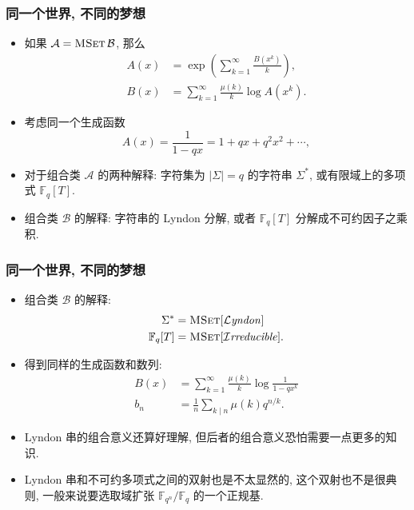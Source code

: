 \documentclass{ctexbeamer}
\newcommand{\bbF}{\mathbb F}
\DeclareMathOperator{\MSet}{\textsc{MSet}}
\begin{document}
\begin{frame}
  \frametitle{同一个世界, 不同的梦想}

  \begin{itemize}
    \item 如果 $\mathcal A = \MSet \mathcal B$, 那么
    \begin{align}
      A(x) &= \exp \left( \sum_{k=1}^\infty \frac{B(x^k)}{k} \right),\\
      B(x) &= \sum_{k=1}^\infty \frac{\mu(k)}{k} \log A(x^k).
    \end{align}
    \item 考虑同一个生成函数
    \begin{equation}
      A(x) = \frac 1{1 - qx} = 1 + qx + q^2 x^2 + \cdots,
    \end{equation}
    \item 对于组合类 $\mathcal A$ 的两种解释: 字符集为 $|\Sigma| = q$ 的字符串 $\Sigma^*$,
    或有限域上的多项式 $\bbF_q[T]$.
    \item 组合类 $\mathcal B$ 的解释: 字符串的 Lyndon 分解, 或者 $\bbF_q[T]$ 分解成不可约因子之乘积.
  \end{itemize}

\end{frame}

\begin{frame}
  \frametitle{同一个世界, 不同的梦想}

  \begin{itemize}
    \item 组合类 $\mathcal B$ 的解释:
    \begin{align}
      \Sigma^* &= \MSet [\mathcal{L}\mathit{yndon}]\\
      \bbF_q[T] &= \MSet [\mathcal{I}\mathit{rreducible}].
    \end{align}
    \item 得到同样的生成函数和数列:
    \begin{align}
      B(x) &= \sum_{k=1}^\infty \frac{\mu(k)}{k}\log \frac 1{1-qx^k}\\
      b_n &= \frac 1 n \sum_{k \mid n} \mu(k) q^{n/k}.
    \end{align}
    \item Lyndon 串的组合意义还算好理解, 但后者的组合意义恐怕需要一点更多的知识.
    \item Lyndon 串和不可约多项式之间的双射也是不太显然的, 这个双射也不是很典则, 一般来说要选取域扩张
    $\bbF_{q^n} / \bbF_q$ 的一个正规基.
  \end{itemize}

\end{frame}
\end{document}
